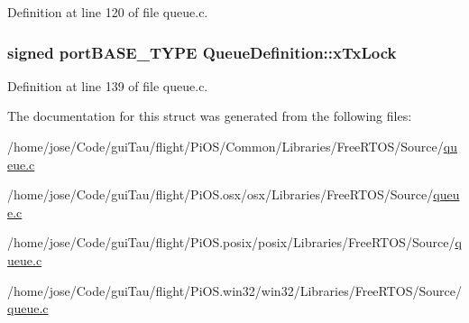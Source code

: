 Definition at line 120 of file queue.\-c.

\hypertarget{struct_queue_definition_a295eddccfd1515f1fe5b12b9e9ec81e0}{
\subsubsection[{x\-Tx\-Lock}]{\setlength{\rightskip}{0pt plus 5cm}signed port\-B\-A\-S\-E\-\_\-\-T\-Y\-P\-E Queue\-Definition\-::x\-Tx\-Lock}}\label{struct_queue_definition_a295eddccfd1515f1fe5b12b9e9ec81e0}


Definition at line 139 of file queue.\-c.



The documentation for this struct was generated from the following files\-:\begin{DoxyCompactItemize}
\item 
/home/jose/\-Code/gui\-Tau/flight/\-Pi\-O\-S/\-Common/\-Libraries/\-Free\-R\-T\-O\-S/\-Source/\hyperlink{_common_2_libraries_2_free_r_t_o_s_2_source_2queue_8c}{queue.\-c}\item 
/home/jose/\-Code/gui\-Tau/flight/\-Pi\-O\-S.\-osx/osx/\-Libraries/\-Free\-R\-T\-O\-S/\-Source/\hyperlink{osx_2osx_2_libraries_2_free_r_t_o_s_2_source_2queue_8c}{queue.\-c}\item 
/home/jose/\-Code/gui\-Tau/flight/\-Pi\-O\-S.\-posix/posix/\-Libraries/\-Free\-R\-T\-O\-S/\-Source/\hyperlink{posix_2posix_2_libraries_2_free_r_t_o_s_2_source_2queue_8c}{queue.\-c}\item 
/home/jose/\-Code/gui\-Tau/flight/\-Pi\-O\-S.\-win32/win32/\-Libraries/\-Free\-R\-T\-O\-S/\-Source/\hyperlink{win32_2win32_2_libraries_2_free_r_t_o_s_2_source_2queue_8c}{queue.\-c}\end{DoxyCompactItemize}
